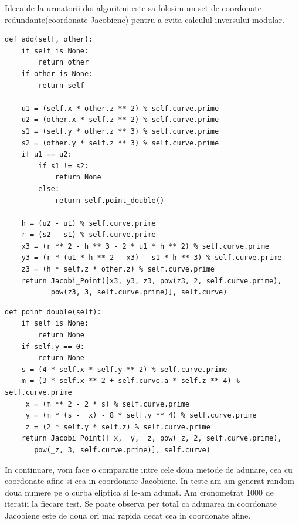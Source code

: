 Ideea de la urmatorii doi algoritmi  este sa folosim un set de coordonate redundante(coordonate Jacobiene) pentru a evita calculul inversului modular.

\begin{lstlisting}
def add(self, other):
    if self is None:
        return other
    if other is None:
        return self

    u1 = (self.x * other.z ** 2) % self.curve.prime
    u2 = (other.x * self.z ** 2) % self.curve.prime
    s1 = (self.y * other.z ** 3) % self.curve.prime
    s2 = (other.y * self.z ** 3) % self.curve.prime
    if u1 == u2:
        if s1 != s2:
            return None
        else:
            return self.point_double()

    h = (u2 - u1) % self.curve.prime
    r = (s2 - s1) % self.curve.prime
    x3 = (r ** 2 - h ** 3 - 2 * u1 * h ** 2) % self.curve.prime
    y3 = (r * (u1 * h ** 2 - x3) - s1 * h ** 3) % self.curve.prime
    z3 = (h * self.z * other.z) % self.curve.prime
    return Jacobi_Point([x3, y3, z3, pow(z3, 2, self.curve.prime), 
           pow(z3, 3, self.curve.prime)], self.curve)
\end{lstlisting}

\begin{lstlisting}
def point_double(self):
    if self is None:
        return None
    if self.y == 0:
        return None
    s = (4 * self.x * self.y ** 2) % self.curve.prime
    m = (3 * self.x ** 2 + self.curve.a * self.z ** 4) % self.curve.prime
    _x = (m ** 2 - 2 * s) % self.curve.prime
    _y = (m * (s - _x) - 8 * self.y ** 4) % self.curve.prime
    _z = (2 * self.y * self.z) % self.curve.prime
    return Jacobi_Point([_x, _y, _z, pow(_z, 2, self.curve.prime), 
	   pow(_z, 3, self.curve.prime)], self.curve)
\end{lstlisting}

In continuare, vom face o comparatie intre cele doua metode de adunare, cea cu coordonate afine si cea in coordonate Jacobiene. In teste am am generat random doua numere pe o curba eliptica si le-am adunat. Am cronometrat 1000 de iteratii la fiecare test. Se poate observa per total ca adunarea in coordonate Jacobiene este de doua ori mai rapida decat cea in coordonate afine.

